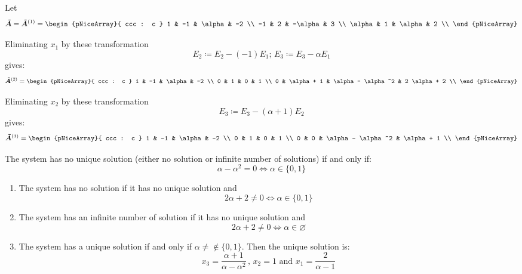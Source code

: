 \documentclass[../../../../Assignments]{subfiles}
\begin{document}
\begin{solution}
    Let
    \[
        \bm{\tilde{A}} = \bm{\tilde{A}}^{(1)} =
            \begin{pNiceArray}{ ccc : c }
                    1   &  -1  &   \alpha  &  -2  \\
                   -1   &   2  &  -\alpha  &   3  \\
                \alpha  &   1  &   \alpha  &   2  \\
            \end{pNiceArray}
    \]

    Eliminating \(x_1\) by these transformation
    \[E_2 \coloneqq E_2 - (-1) E_1; \, E_3 \coloneqq E_3 - \alpha E_1\]
    gives:
    \[
        \bm{\tilde{A}}^{(2)} =
            \begin{pNiceArray}{ ccc : c }
                1  &      -1      &        \alpha       &       -2       \\
                0  &       1      &           0         &        1       \\
                0  &  \alpha + 1  &  \alpha - \alpha^2  &  2 \alpha + 2  \\
            \end{pNiceArray}
    \]

    Eliminating \(x_2\) by these transformation
    \[E_3 \coloneqq E_3 - (\alpha + 1) E_2\]
    gives:
    \[
        \bm{\tilde{A}}^{(3)} =
            \begin{pNiceArray}{ ccc : c }
                1  &  -1  &        \alpha       &      -2      \\
                0  &   1  &           0         &       1      \\
                0  &   0  &  \alpha - \alpha^2  &  \alpha + 1  \\
            \end{pNiceArray}
    \]

    The system has no unique solution (either no solution or infinite number of
    solutions) if and only if:
    \[\alpha - \alpha^2 = 0 \iff \alpha \in \{0, 1\}\]

    \begin{enumerate}[label = \alph*)]
        \item The system has no solution if it has no unique solution and
            \[2 \alpha + 2 \neq 0 \iff \alpha \in \{0, 1\}\]

        \item The system has an infinite number of solution if it has no unique
            solution and
            \[2 \alpha + 2 \neq 0 \iff \alpha \in \varnothing\]

        \item The system has a unique solution if and only if \(\alpha
            \neq\notin \{0, 1\}\). Then the unique solution is:
            \[x_3 = \frac{\alpha + 1}{\alpha - \alpha^2} \, \text{, } x_2 = 1 \text{ and } x_1 = \frac{2}{\alpha - 1}\]
    \end{enumerate}
\end{solution}
\end{document}
